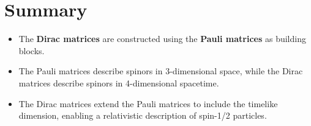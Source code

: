 \documentclass{article}
\begin{document}
\section*{Summary}

\begin{itemize}
\item The \textbf{Dirac matrices} are constructed using the \textbf{Pauli
matrices} as building blocks. 

\item The Pauli matrices describe spinors in 3-dimensional space, while the
Dirac matrices describe spinors in 4-dimensional spacetime. 

\item The Dirac matrices extend the Pauli matrices to include the timelike
dimension, enabling a relativistic description of spin-1/2 particles.
\end{itemize}
\end{document}
